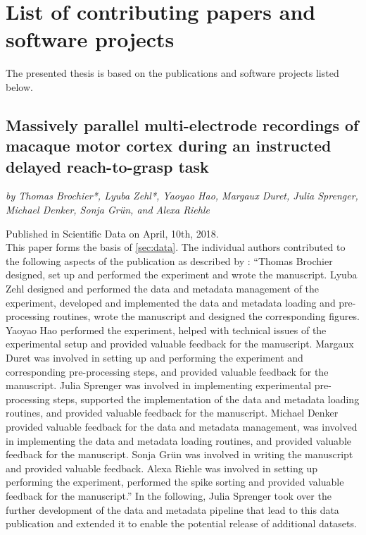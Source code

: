 \hypersetup{pageanchor=false} %

\clearpage
\pagestyle{plain}
\section*{List of contributing papers and software projects}
\label{sec:ListofPapers}


The presented thesis is based on the publications and software projects listed below.


\subsection*{Massively parallel multi-electrode recordings of macaque motor cortex during an instructed delayed reach-to-grasp task}
\textit{by Thomas Brochier*, Lyuba Zehl*, Yaoyao Hao, Margaux Duret, Julia Sprenger, Michael Denker, Sonja Grün, and Alexa Riehle}

Published in Scientific Data on April, 10th, 2018. \citep{Brochier_2018}\\

This paper forms the basis of \cref{sec:data}. The individual authors contributed to the following aspects of the publication as described by \citet{Zehl_2018}: ``Thomas Brochier designed, set up and performed the experiment and wrote the manuscript. Lyuba Zehl designed and performed the data and metadata management of the experiment, developed and implemented the data and metadata loading and pre-processing routines, wrote the manuscript and designed the corresponding figures. Yaoyao Hao performed the experiment, helped with technical issues of the experimental setup and provided valuable feedback for the manuscript. Margaux Duret was involved in setting up and performing the experiment and corresponding pre-processing steps, and provided valuable feedback for the manuscript. Julia Sprenger was involved in implementing experimental pre-processing steps, supported the implementation of the data and metadata loading routines, and provided valuable feedback for the manuscript. Michael Denker provided valuable feedback for the data and metadata management, was involved in implementing the data and metadata loading routines, and provided valuable feedback for the manuscript. Sonja Grün was involved in writing the manuscript and provided valuable feedback. Alexa Riehle was involved in setting up performing the experiment, performed the spike sorting and provided valuable feedback for the manuscript.'' In the following, Julia Sprenger took over the further development of the data and metadata pipeline that lead to this data publication and extended it to enable the potential release of additional datasets. 


